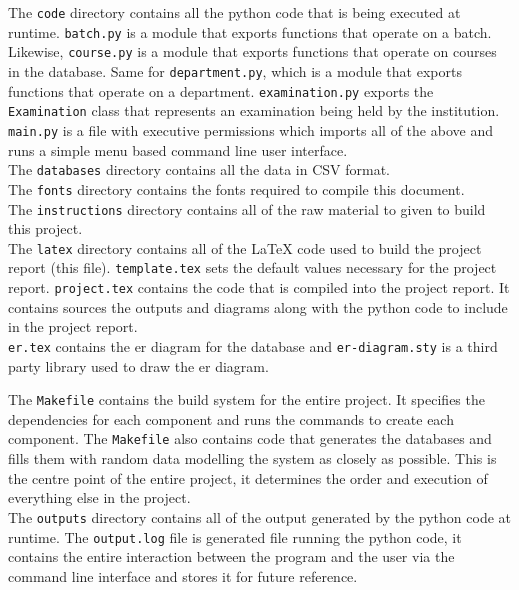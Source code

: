 \documentclass{article}
\begin{document}
		The \texttt{code} directory contains all the python code that is being executed at runtime.
		\texttt{batch.py} is a module that exports functions that operate on a batch.
		Likewise, \texttt{course.py} is a module that exports functions that operate on courses in the database.
		Same for \texttt{department.py}, which is a module that exports functions that operate on a department.
		\texttt{examination.py} exports the \texttt{Examination} class that represents an examination being held by the institution.\\
		\texttt{main.py} is a file with executive permissions which imports all of the above and runs a simple menu based command line user interface.\\

		The \texttt{databases} directory contains all the data in CSV format.\\

		The \texttt{fonts} directory contains the fonts required to compile this document.\\

		The \texttt{instructions} directory contains all of the raw material to given to build this project.\\

		The \texttt{latex} directory contains all of the \LaTeX{} code used to build the project report (this file).
		\texttt{template.tex} sets the default values necessary for the project report.
		\texttt{project.tex} contains the code that is compiled into the project report. It contains sources the outputs and diagrams along with the python code to include in the project report.\\
		\texttt{er.tex} contains the er diagram for the database and \texttt{er-diagram.sty} is a third party library used to draw the er diagram.

		The \texttt{Makefile} contains the build system for the entire project. It specifies the dependencies for each component and runs the commands to create each component. The \texttt{Makefile} also contains code that generates the databases and fills them with random data modelling the system as closely as possible. This is the centre point of the entire project, it determines the order and execution of everything else in the project.\\

		The \texttt{outputs} directory contains all of the output generated by the python code at runtime.
		The \texttt{output.log} file is generated file running the python code, it contains the entire interaction between the program and the user via the command line interface and stores it for future reference.
\end{document}
